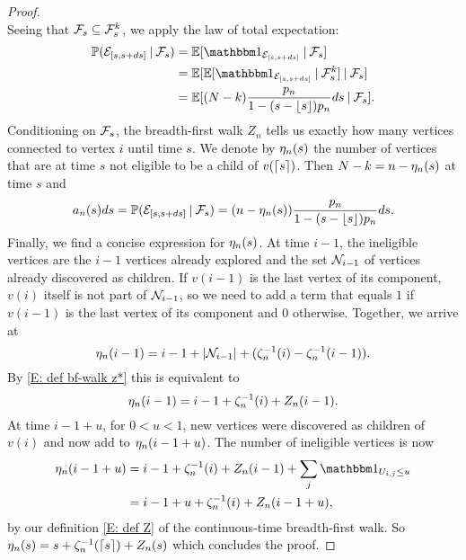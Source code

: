 \begin{proof}
\begin{equation}
	\end{equation}
	Seeing that $\mathcal{F}_s \subseteq \mathcal{F}_s^k$,
	we apply the law of total expectation:
	\begin{equation}
	\begin{aligned}
	\Prob(\NewEdge{[s,s+ds]} \cond \SigmaAlgebra_s)
	&= \Exp{\Ind{\NewEdge{[s,s+ds]}} \cond \SigmaAlgebra_s} \\
	&= \Exp{ \Exp{\Ind{\NewEdge{[s,s+ds]}} \cond \SigmaAlgebra_s^k} \cond \SigmaAlgebra_s} \\
	&= \Exp{ (N-k) \ps ds \cond \SigmaAlgebra_s}.
	\end{aligned}
	\end{equation}
	Conditioning on $\mathcal{F}_s$,
	the breadth-first walk $Z_n$ tells us exactly how many vertices connected to vertex $i$ until time $s$.
	We denote by $\eta_n(s)$ the number of vertices that are at time $s$ not eligible to be a child of $v(\lceil s\rceil)$.
	Then $N-k=n-\eta_n(s)$ at time $s$ and
	\begin{equation}
	a_n(s)ds = \mathbb{P}(\mathcal{E}_{[s, s+ds]} \: | \: \mathcal{F}_s) = (n - \eta_n(s)) \frac{p_n}{1-(s-\lfloor s\rfloor)p_n} ds.
	\end{equation}
	Finally, we find a concise expression for $\eta_n(s)$.
	At time $i-1$, the ineligible vertices are the $i-1$ vertices already explored
	and the set $\mathcal{N}_{i-1}$ of vertices already discovered as children.
	If $v(i-1)$ is the last vertex of its component,
	$v(i)$ itself is not part of $\mathcal{N}_{i-1}$, 
	so we need to add a term that equals $1$ if $v(i-1)$ is the last vertex of its component and $0$ otherwise.
	Together, we arrive at
	\begin{equation}
	\eta_n(i-1) = i-1 + |\mathcal{N}_{i-1}| + (\zeta^{-1}_n(i) - \zeta^{-1}_n(i-1)).
	\end{equation}
	By \eqref{E: def bf-walk z*} this is equivalent to
	\begin{equation}
	\eta_n(i-1) = i-1 + \zeta^{-1}_n(i) + Z_n(i-1).
	\end{equation}
	At time $i-1+u$, for $0<u<1$, 
	new vertices were discovered as children of $v(i)$ and now add to $\eta_n(i-1+u)$.
	The number of ineligible vertices is now
	\begin{equation}
	\begin{aligned}
	\Ineligible{i-1+u} 
	&= i-1 + \ZetaMinus{i} + \Zn{i-1} + \sum_{j} \Ind{\Uij \leq u} \\
	&= i-1+u + \ZetaMinus{i} + \Zn{i-1+u},
	\end{aligned}
	\end{equation} 
	by our definition \eqref{E: def Z} of the continuous-time breadth-first walk.
	So $\eta_n(s) = s + \zeta^{-1}_n(\lceil s\rceil) + Z_n(s)$ which concludes the proof.
\end{proof}

